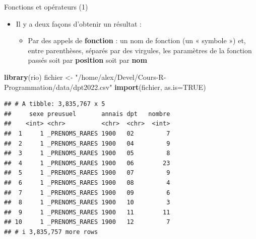 \documentclass[
  ignorenonframetext,
]{beamer}
\newenvironment{Shaded}{\begin{snugshade}}{\end{snugshade}}
\newcommand{\AttributeTok}[1]{\textcolor[rgb]{0.13,0.29,0.53}{#1}}
\newcommand{\ConstantTok}[1]{\textcolor[rgb]{0.56,0.35,0.01}{#1}}
\newcommand{\FunctionTok}[1]{\textcolor[rgb]{0.13,0.29,0.53}{\textbf{#1}}}
\newcommand{\NormalTok}[1]{#1}
\newcommand{\OtherTok}[1]{\textcolor[rgb]{0.56,0.35,0.01}{#1}}
\newcommand{\StringTok}[1]{\textcolor[rgb]{0.31,0.60,0.02}{#1}}
\providecommand{\tightlist}{%
  \setlength{\itemsep}{0pt}\setlength{\parskip}{0pt}}
\begin{document}
\begin{frame}[fragile]{Fonctions et opérateurs (1)}
\protect\hypertarget{fonctions-et-opuxe9rateurs-1}{}
\begin{itemize}
\tightlist
\item
  Il y a deux façons d'obtenir un résultat :

  \begin{itemize}
  \tightlist
  \item
    Par des appels de \textbf{fonction} : un nom de fonction (un «
    symbole ») et, entre parenthèses, séparés par des virgules, les
    paramètres de la fonction passés soit par \textbf{position} soit par
    \textbf{nom}
  \end{itemize}
\end{itemize}

\tiny

\begin{Shaded}
\begin{Highlighting}[]
\FunctionTok{library}\NormalTok{(rio)}
\NormalTok{fichier }\OtherTok{\textless{}{-}} \StringTok{"/home/alex/Devel/Cours{-}R{-}Programmation/data/dpt2022.csv"}
\FunctionTok{import}\NormalTok{(fichier, }\AttributeTok{as.is=}\ConstantTok{TRUE}\NormalTok{)}
\end{Highlighting}
\end{Shaded}

\begin{verbatim}
## # A tibble: 3,835,767 x 5
##     sexe preusuel       annais dpt   nombre
##    <int> <chr>          <chr>  <chr>  <int>
##  1     1 _PRENOMS_RARES 1900   02         7
##  2     1 _PRENOMS_RARES 1900   04         9
##  3     1 _PRENOMS_RARES 1900   05         8
##  4     1 _PRENOMS_RARES 1900   06        23
##  5     1 _PRENOMS_RARES 1900   07         9
##  6     1 _PRENOMS_RARES 1900   08         4
##  7     1 _PRENOMS_RARES 1900   09         6
##  8     1 _PRENOMS_RARES 1900   10         3
##  9     1 _PRENOMS_RARES 1900   11        11
## 10     1 _PRENOMS_RARES 1900   12         7
## # i 3,835,757 more rows
\end{verbatim}

\normalsize
\end{frame}
\end{document}

